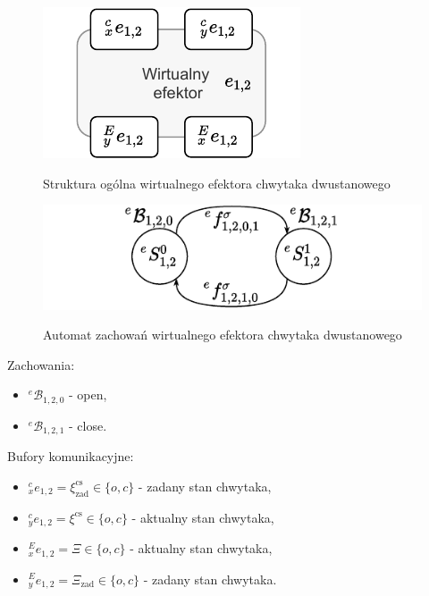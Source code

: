 \begin{figure}
    \centering
    \includegraphics[width=0.75\columnwidth]{figures/ISR-ve-gripper-model.pdf}
    \label{fig:model-vr-camera}
    \caption{Struktura ogólna wirtualnego efektora chwytaka dwustanowego}
\end{figure}

\begin{figure}
    \centering
    \includegraphics[width=\columnwidth]{figures/ISR-ve-gripper-behaviours.pdf}
    \label{fig:zachowania-ve-gripper}
    \caption{Automat zachowań wirtualnego efektora chwytaka dwustanowego}
\end{figure}

Zachowania:
\begin{itemize}
    \item ${}^{e}\mathcal{B}_{1,2,0}$ - open,
    \item ${}^{e}\mathcal{B}_{1,2,1}$ - close.
\end{itemize}

Bufory komunikacyjne:
\begin{itemize}
    \item ${}^{c}_{x}e_{1,2} = \xi^{\mathrm{cs}}_{\mathrm{zad}} \in \{o, c\}$ - zadany stan chwytaka,
    \item ${}^{c}_{y}e_{1,2} = \xi^{\mathrm{cs}} \in \{o, c\}$ - aktualny stan chwytaka,
    \item ${}^{E}_{x}e_{1,2} = \Xi \in \{o, c\}$ - aktualny stan chwytaka,
    \item ${}^{E}_{y}e_{1,2} = \Xi_{\mathrm{zad}} \in \{o, c\}$ - zadany stan chwytaka.
\end{itemize}

